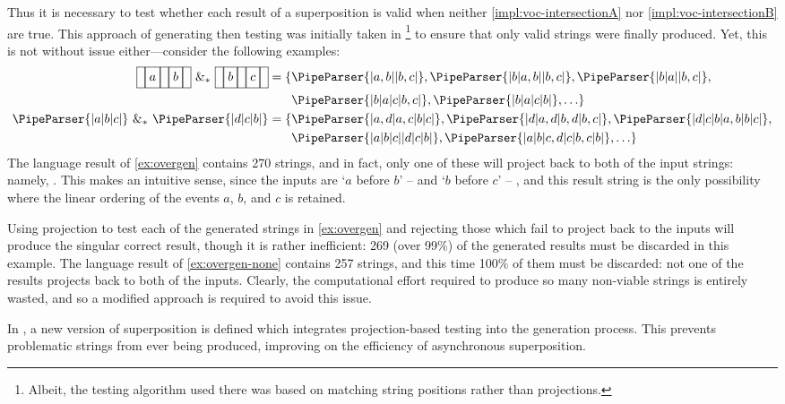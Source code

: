 \documentclass[a4paper,12pt,leqno]{article}
\newcommand{\vph}[1]{\vphantom{#1}}
\newcommand{\ebox}[1]{\fbox{$\vph{'(),}#1$}}
\newcommand{\nbBefore}[2]{\ebox{#1}\ebox{}\ebox{#2}}
\newcommand{\Before}[2]{\ebox{}\nbBefore{#1}{#2}\ebox{}}
\newcommand{\cBefore}[2]{`$#1$  before $#2$' -- \Before{#1}{#2}}
\newcommand{\spasync}{~\&_*~}
\newcommand{\EventString}[1]{%
	\renewcommand*{\do}[1]{\ebox{##1}}%
	\PipeParser{#1}%
}
\begin{document}
Thus it is necessary to test whether each result of a superposition is valid when neither \cref{impl:voc-intersectionA} nor \cref{impl:voc-intersectionB} are true. This approach of generating then testing was initially taken in \citet{woods2017towards}\footnote{Albeit, the testing algorithm used there was based on matching string positions rather than projections.} to ensure that only valid strings were finally produced. Yet, this is not without issue either---consider the following examples:
\begin{align}
	\Before{a}{b} \spasync \Before{b}{c} = \{&\EventString{{}|a,b|{}|b,c|{}}, \EventString{{}|b|a,b|{}|b,c|{}}, \EventString{{}|b|a|{}|b,c|{}},\label{ex:overgen}\\
	&\EventString{{}|b|a|c|b,c|{}}, \EventString{{}|b|a|c|b|{}}, \ldots\}\notag\\
	\EventString{{}|a|b|c|{}} \spasync \EventString{{}|d|c|b|{}} = \{&\EventString{{}|a,d|a,c|b|c|{}}, \EventString{{}|d|a,d|b,d|b,c|{}}, \EventString{{}|d|c|b|a,b|b|c|{}},\label{ex:overgen-none}\\
	&\EventString{{}|a|b|c|{}|d|c|b|{}}, \EventString{{}|a|b|c,d|c|b,c|b|{}}, \ldots\}\notag
\end{align}
The language result of \cref{ex:overgen} contains 270 strings, and in fact, only one of these will project back to both of the input strings: namely, \EventString{{}|a|{}|b|{}|c|{}}. This makes an intuitive sense, since the inputs are \cBefore{a}{b} and \cBefore{b}{c}, and this result string is the only possibility where the linear ordering of the events $a$, $b$, and $c$ is retained.

Using projection to test each of the generated strings in \cref{ex:overgen} and rejecting those which fail to project back to the inputs will produce the singular correct result, though it is rather inefficient: 269 (over 99\%) of the generated results must be discarded in this example. The language result of \cref{ex:overgen-none} contains 257 strings, and this time 100\% of them must be discarded: not one of the results projects back to both of the inputs. Clearly, the computational effort required to produce so many non-viable strings is entirely wasted, and so a modified approach is required to avoid this issue.

In \citet{woods2018improving}, a new version of superposition is defined which integrates projection-based testing into the generation process. This prevents problematic strings from ever being produced, improving on the efficiency of asynchronous superposition.
\end{document}
